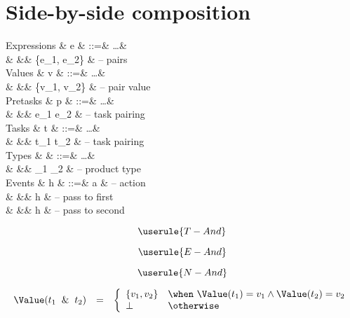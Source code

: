 
\section{Side-by-side composition}

\begin{grammar}
  Expressions
    & e    & ::=& \ldots               & \\
    &      &\mid& \{e_1, e_2\}         & – pairs \\
  Values
    & v    & ::=& \ldots               & \\
    &      &\mid& \{v_1, v_2\}         & – pair value \\
  Pretasks
    & p    & ::=& \ldots               & \\
    &      &\mid& e_1 \And e_2         & – task pairing \\
  Tasks
    & t    & ::=& \ldots               & \\
    &      &\mid& t_1 \And t_2         & – task pairing \\
  Types
    & \tau & ::=& \ldots               & \\
    &      &\mid& \tau_1 \times \tau_2 & – product type \\
  Events
    & h    & ::=& a                    & – action \\
    &      &\mid& \First h             & – pass to first \\
    &      &\mid& \Second h            & – pass to second \\
\end{grammar}

\begin{equation*}
  \userule{T-And}
\end{equation*}

\begin{equation*}
  \userule{E-And}
\end{equation*}

\begin{equation*}
  \userule{N-And}
\end{equation*}

\begin{equation*}
  \begin{array}{lcl}
    \Value(t_1 \And t_2) &=& \left\{
      \begin{array}{ll}
        \{v_1, v_2\} & \when\ \Value(t_1) = v_1 \land \Value(t_2) = v_2 \\
        \bot         & \otherwise
      \end{array}
    \right.
  \end{array}
\end{equation*}

